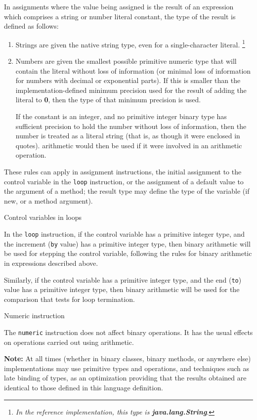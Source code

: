 \begin{description}
In assignments where the value being assigned is the result of an
expression which comprises a string or number literal constant, the
type of the result is defined as follows:
\begin{enumerate}
\item Strings are given the native string type, even for a
single-character literal.
\footnote{
\emph{In the reference implementation, this type is \textbf{java.lang.String}}.
}
\item Numbers are given the smallest possible primitive numeric type that
will contain the literal without loss of information (or minimal loss of
information for numbers with decimal or exponential parts).
If this is smaller than the implementation-defined minimum precision
used for the result of adding the literal to \textbf{0}, then the type
of that minimum precision is used.
 
If the constant is an integer, and no primitive integer binary type has
sufficient precision to hold the number without loss of information,
then the number is treated as a literal string (that is, as though it
were enclosed in quotes).  \nr{} arithmetic would then be used if it
were involved in an arithmetic operation.
\end{enumerate}
 
These rules can apply in assignment instructions, the initial assignment
to the control variable in the \texttt{loop} instruction, or the
assignment of a default value to the argument of a method; the result
type may define the type of the variable (if new, or a method argument).
\item{Control variables in loops}
 
In the \texttt{loop} instruction, if the control variable has a
primitive integer type, and the increment (\texttt{by} value) has a
primitive integer type, then binary arithmetic will be used for stepping
the control variable, following the rules for binary arithmetic in
expressions described above.
 
Similarly, if the control variable has a primitive integer type, and the
end (\texttt{to}) value has a primitive integer type, then binary
arithmetic will be used for the comparison that tests for loop
termination.
\item{Numeric instruction}
 
The \texttt{numeric} instruction does not affect binary operations.
It has the usual effects on operations carried out using \nr{}
arithmetic.
\end{description}
\textbf{Note: }
At all times (whether in binary classes, binary methods, or anywhere
else) implementations may use primitive types and operations, and
techniques such as late binding of types, as an optimization
providing that the results obtained are identical to those defined in
this language definition.
